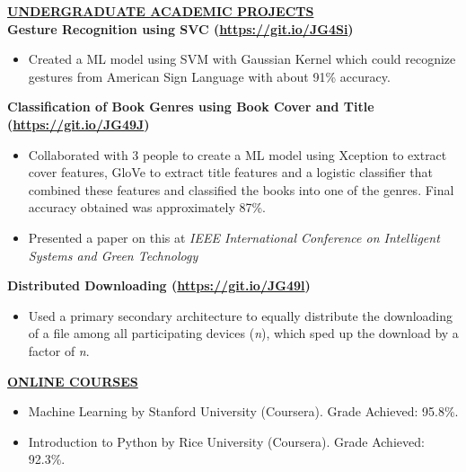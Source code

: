 \documentclass{article}
\begin{document}
\noindent \textbf{\underline{UNDERGRADUATE ACADEMIC PROJECTS}} \\
\noindent \textbf{Gesture Recognition using SVC (\url{https://git.io/JG4Si})} 
\begin{itemize}[noitemsep,nolistsep,leftmargin=*]
\item {Created a ML model using SVM with Gaussian Kernel which could recognize gestures from American Sign Language with about 91\% accuracy. \\}
\end{itemize}

\noindent \textbf{Classification of Book Genres using Book Cover and Title (\url{https://git.io/JG49J})} 
\begin{itemize}[noitemsep,nolistsep,leftmargin=*]
\item {Collaborated with 3 people to create a ML model using Xception to extract cover features, GloVe to extract title features and a logistic classifier that combined these features and classified the books into one of the genres. Final accuracy obtained was approximately 87\%.}
\item {Presented a paper on this at \textit{IEEE International Conference on Intelligent Systems and Green Technology}\\}
\end{itemize}

\noindent \textbf{Distributed Downloading (\url{https://git.io/JG49l})} 
\begin{itemize}[noitemsep,nolistsep,leftmargin=*]
\item {Used a primary secondary architecture to equally distribute the downloading of a file among all participating devices (\textit{n}), which sped up the download by a factor of \textit{n}. \\}
\end{itemize}


\noindent \textbf{\underline{ONLINE COURSES}}
\begin{itemize}[noitemsep,nolistsep,leftmargin=*]
\item {Machine Learning by Stanford University (Coursera). Grade Achieved: 95.8\%.} 
\item {Introduction to Python by Rice University (Coursera). Grade Achieved: 92.3\%.}
\end{itemize}
\end{document}

